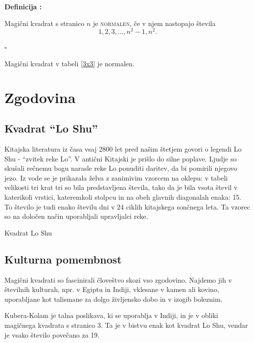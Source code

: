 \documentclass[a4paper,12pt]{article}
\newcommand{\pojem}[1]{\textsc{#1}}
\newcounter{definicija} %
\newenvironment{definicija} 
{
	\stepcounter{definicija} %
	\begin{flushleft} %
	\textbf{Definicija \arabic{definicija}:} %
}
{
	\hfill $\square $ %
	\end{flushleft}
}
\begin{document}
\begin{definicija}
   Magični kvadrat s stranico $n$ je \pojem{normalen}, če v njem nastopajo števila
\begin{equation} 
\label{enacba}  
   1,2,3,\ldots,n^2 - 1,n^2.
\end{equation}

\end{definicija}

Magični kvadrat v tabeli \ref{3x3} je normalen.

\section{Zgodovina}

\subsection{Kvadrat "`Lo Shu"'}


Kitajska literatura iz časa vsaj 2800 let pred našim štetjem govori o legendi
Lo Shu - "`zvitek reke Lo"'. V antični Kitajski je prišlo do
silne poplave. Ljudje so skušali rečnemu bogu narasle reke Lo ponuditi daritev,
da bi pomirili njegovo jezo. Iz vode se je prikazala želva z zanimivim vzorcem
na oklepu: v tabeli velikosti tri krat tri so bila predstavljena števila, tako
da je bila vsota števil v katerikoli vrstici, kateremkoli stolpcu in na obeh
glavnih diagonalah enaka: 15. To število je tudi enako številu dni v 24 ciklih
kitajskega sončnega leta. Ta vzorec so na določen način uporabljali upravljalci
reke.

Kvadrat Lo Shu

\subsection{Kulturna pomembnost}


Magični kvadrati so fascinirali človeštvo skozi vso zgodovino. Najdemo jih
v številnih kulturah, npr. v Egiptu in Indiji, vklesane v kamen ali
kovino, uporabljane kot talismane za dolgo življensko dobo in v
izogib boleznim.

Kubera-Kolam je talna poslikava, ki se uporablja v Indiji, in je v
obliki magičnega kvadrata s stranico 3. Ta je v bistvu enak kot kvadrat
Lo Shu, vendar je vsako število povečano za 19.
\end{document}
